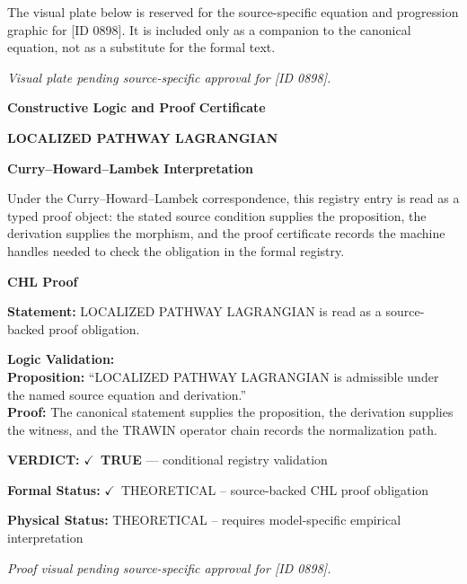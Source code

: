 \begingroup\footnotesize\sloppy
The visual plate below is reserved for the source-specific equation and progression graphic for [ID 0898]. It is included only as a companion to the canonical equation, not as a substitute for the formal text.
\par\endgroup
\begingroup\footnotesize\itshape
Visual plate pending source-specific approval for [ID 0898].
\par\endgroup

\clearpage
\begingroup\tzpsupportsetup
\noindent\textbf{\fontsize{10.8pt}{12.8pt}\selectfont [ID 0898] Constructive Logic and Proof Certificate}\par
\noindent\textbf{\fontsize{10pt}{12pt}\selectfont LOCALIZED PATHWAY LAGRANGIAN}\par
\vspace{0.45em}
\begingroup
\footnotesize
\setlength{\parskip}{0.22em}
\setlength{\parindent}{0pt}
\noindent\textbf{Curry--Howard--Lambek Interpretation}\par
Under the Curry--Howard--Lambek correspondence, this registry entry is read as a typed proof
object: the stated source condition supplies the proposition, the derivation supplies the
morphism, and the proof certificate records the machine handles needed to check the obligation
in the formal registry.

\vspace{0.45em}
\noindent\textbf{CHL Proof}\par
\textbf{Statement:} LOCALIZED PATHWAY LAGRANGIAN is read as a source-backed proof obligation.

\textbf{Logic Validation:}\\
\textbf{Proposition:} ``LOCALIZED PATHWAY LAGRANGIAN is admissible under the named source equation and derivation.''\\
\textbf{Proof:} The canonical statement supplies the proposition, the derivation supplies the witness, and the TRAWIN operator chain records the normalization path.

\textbf{VERDICT:} \ensuremath{\checkmark}\ \textbf{TRUE} --- conditional registry validation

\textbf{Formal Status:} \ensuremath{\checkmark}\ THEORETICAL -- source-backed CHL proof obligation

\textbf{Physical Status:} THEORETICAL -- requires model-specific empirical interpretation
\par\vspace{0.45em}
\par
\vfill
\begingroup\footnotesize\itshape
Proof visual pending source-specific approval for [ID 0898].
\par\endgroup
\vfill
\endgroup
\endgroup
